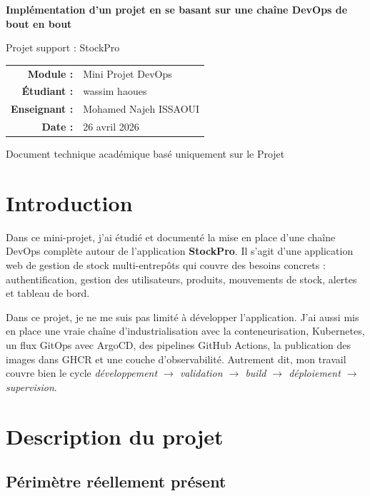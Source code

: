 \documentclass[10pt,a4paper]{article}
\begin{document}
\begin{titlepage}
\centering
\vspace*{2.8cm}
{\Huge\bfseries Implémentation d'un projet en se basant sur une chaîne DevOps de bout en bout\par}
\vspace{0.6cm}
{\Large Projet support : StockPro\par}
\vspace{2cm}
\begin{tabular}{rl}
\textbf{Module :} & Mini Projet DevOps \\
\textbf{Étudiant :} & wassim haoues \\
\textbf{Enseignant :} & Mohamed Najeh ISSAOUI \\
\textbf{Date :} & 26 avril 2026 \\
\end{tabular}
\vfill
{\large Document technique académique basé uniquement sur le Projet\par}
\end{titlepage}

\tableofcontents
\newpage
\small

\section{Introduction}

Dans ce mini-projet, j'ai étudié et documenté la mise en place d'une chaîne DevOps complète autour de l'application \textbf{StockPro}. Il s'agit d'une application web de gestion de stock multi-entrepôts qui couvre des besoins concrets : authentification, gestion des utilisateurs, produits, mouvements de stock, alertes et tableau de bord.

Dans ce projet, je ne me suis pas limité à développer l'application. J'ai aussi mis en place une vraie chaîne d'industrialisation avec la conteneurisation, Kubernetes, un flux GitOps avec ArgoCD, des pipelines GitHub Actions, la publication des images dans GHCR et une couche d'observabilité. Autrement dit, mon travail couvre bien le cycle \textit{développement $\rightarrow$ validation $\rightarrow$ build $\rightarrow$ déploiement $\rightarrow$ supervision}.

\section{Description du projet}

\subsection{Périmètre réellement présent}
\end{document}
